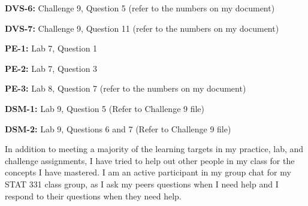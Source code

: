 \documentclass[
  letterpaper,
  DIV=11,
  numbers=noendperiod]{scrartcl}
\begin{document}
\textbf{DVS-6:} Challenge 9, Question 5 (refer to the numbers on my
document)

\textbf{DVS-7:} Challenge 9, Question 11 (refer to the numbers on my
document)

\textbf{PE-1:} Lab 7, Question 1

\textbf{PE-2:} Lab 7, Question 3

\textbf{PE-3:} Lab 8, Question 7 (refer to the numbers on my document)

\textbf{DSM-1:} Lab 9, Question 5 (Refer to Challenge 9 file)

\textbf{DSM-2:} Lab 9, Questions 6 and 7 (Refer to Challenge 9 file)

In addition to meeting a majority of the learning targets in my
practice, lab, and challenge assignments, I have tried to help out other
people in my class for the concepts I have mastered. I am an active
participant in my group chat for my STAT 331 class group, as I ask my
peers questions when I need help and I respond to their questions when
they need help.
\end{document}
